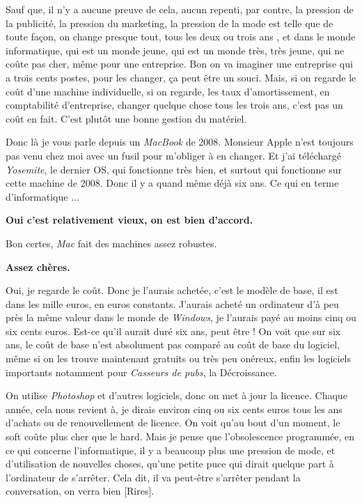 \begin{small}
Sauf que, il n'y a aucune preuve de cela, aucun repenti, par contre, la pression de la publicité, la pression du marketing, la pression de la mode est telle que de toute façon, on change presque tout, tous les deux ou trois ans , et dans le monde informatique, qui est un monde jeune, qui est un monde très, très jeune, qui ne coûte pas cher, même pour une entreprise. Bon on va imaginer une entreprise qui a trois cents postes, pour les changer, ça peut être un souci. Mais, si on regarde le coût d'une machine individuelle, si on regarde, les taux d'amortissement, en comptabilité d'entreprise, changer quelque chose tous les trois ans, c'est pas un coût en fait. C'est plutôt une bonne gestion du matériel.

Donc là je vous parle depuis un \textit{MacBook} de 2008. Monsieur Apple n'est toujours pas venu chez moi avec un fusil pour m'obliger à en changer. Et j'ai téléchargé \textit{Yosemite}, le dernier OS, qui fonctionne très bien, et surtout qui fonctionne sur cette machine de 2008. Donc il y a quand même déjà six ans. Ce qui en terme d'informatique ...

\vspace{1\baselineskip}

\textbf{Oui c'est relativement vieux, on est bien d'accord.}

\vspace{1\baselineskip}

Bon certes, \textit{Mac} fait des machines assez robustes.

\vspace{1\baselineskip}

\textbf{Assez chères.}

\vspace{1\baselineskip}

Oui, je regarde le coût. Donc je l'aurais achetée, c'est le modèle de base, il est dans les mille euros, en euros constants. J'aurais acheté un ordinateur d'à peu près la même valeur dans le monde de \textit{Windows}, je l'aurais payé au moins cinq ou six cents euros. Est-ce qu'il aurait duré six ans, peut être ! On voit que sur six ans, le coût de base n'est absolument pas comparé au coût de base du logiciel, même si on les trouve maintenant gratuits ou très peu onéreux, enfin les logiciels importants notamment pour \textit{Casseurs de pubs}, la Décroissance. 

On utilise \textit{Photoshop} et d'autres logiciels, donc on met à jour la licence. Chaque année, cela nous revient à, je dirais environ cinq ou six cents euros tous les ans d'achats ou de renouvellement de licence. On voit qu'au bout d'un moment, le soft coûte plus cher que le hard. Mais je pense que l'obsolescence programmée, en ce qui concerne l'informatique, il y a beaucoup plus une pression de mode, et d'utilisation de nouvelles choses, qu'une petite puce qui dirait quelque part à l'ordinateur de s'arrêter. Cela dit, il va peut-être s'arrêter pendant la conversation, on verra bien [Rires].


\end{small}
